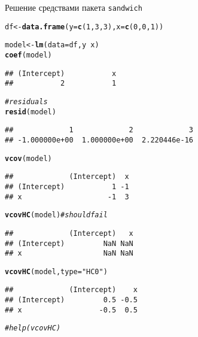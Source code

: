 \documentclass[pdftex,11pt,openany]{book}\usepackage[]{graphicx}\usepackage[]{color}
\makeatletter
\newcommand{\hlnum}[1]{\textcolor[rgb]{0.686,0.059,0.569}{#1}}%
\newcommand{\hlstr}[1]{\textcolor[rgb]{0.192,0.494,0.8}{#1}}%
\newcommand{\hlcom}[1]{\textcolor[rgb]{0.678,0.584,0.686}{\textit{#1}}}%
\newcommand{\hlopt}[1]{\textcolor[rgb]{0,0,0}{#1}}%
\newcommand{\hlstd}[1]{\textcolor[rgb]{0.345,0.345,0.345}{#1}}%
\newcommand{\hlkwb}[1]{\textcolor[rgb]{0.69,0.353,0.396}{#1}}%
\newcommand{\hlkwc}[1]{\textcolor[rgb]{0.333,0.667,0.333}{#1}}%
\newcommand{\hlkwd}[1]{\textcolor[rgb]{0.737,0.353,0.396}{\textbf{#1}}}%
\newenvironment{kframe}{%
 \def\at@end@of@kframe{}%
 \ifinner\ifhmode%
  \def\at@end@of@kframe{\end{minipage}}%
  \begin{minipage}{\columnwidth}%
 \fi\fi%
 \def\FrameCommand##1{\hskip\@totalleftmargin \hskip-\fboxsep
 \colorbox{shadecolor}{##1}\hskip-\fboxsep
     \hskip-\linewidth \hskip-\@totalleftmargin \hskip\columnwidth}%
 \MakeFramed {\advance\hsize-\width
   \@totalleftmargin\z@ \linewidth\hsize
   \@setminipage}}%
 {\par\unskip\endMakeFramed%
 \at@end@of@kframe}
\newenvironment{knitrout}{}{} %
\makeatother
\begin{document}
\begin{solution}
Решение средствами пакета \verb|sandwich|
\begin{knitrout}
\color{fgcolor}\begin{kframe}
\begin{alltt}
\hlstd{df} \hlkwb{<-} \hlkwd{data.frame}\hlstd{(}\hlkwc{y}\hlstd{=}\hlkwd{c}\hlstd{(}\hlnum{1}\hlstd{,}\hlnum{3}\hlstd{,}\hlnum{3}\hlstd{),} \hlkwc{x}\hlstd{=}\hlkwd{c}\hlstd{(}\hlnum{0}\hlstd{,}\hlnum{0}\hlstd{,}\hlnum{1}\hlstd{))}

\hlstd{model} \hlkwb{<-} \hlkwd{lm}\hlstd{(}\hlkwc{data}\hlstd{=df, y}\hlopt{~}\hlstd{x)}
\hlkwd{coef}\hlstd{(model)}
\end{alltt}
\begin{verbatim}
## (Intercept)           x 
##           2           1
\end{verbatim}
\begin{alltt}
\hlcom{# residuals}
\hlkwd{resid}\hlstd{(model)}
\end{alltt}
\begin{verbatim}
##             1             2             3 
## -1.000000e+00  1.000000e+00  2.220446e-16
\end{verbatim}
\begin{alltt}
\hlkwd{vcov}\hlstd{(model)}
\end{alltt}
\begin{verbatim}
##             (Intercept)  x
## (Intercept)           1 -1
## x                    -1  3
\end{verbatim}
\begin{alltt}
\hlkwd{vcovHC}\hlstd{(model)} \hlcom{# should fail}
\end{alltt}
\begin{verbatim}
##             (Intercept)   x
## (Intercept)         NaN NaN
## x                   NaN NaN
\end{verbatim}
\begin{alltt}
\hlkwd{vcovHC}\hlstd{(model,} \hlkwc{type} \hlstd{=}\hlstr{"HC0"} \hlstd{)}
\end{alltt}
\begin{verbatim}
##             (Intercept)    x
## (Intercept)         0.5 -0.5
## x                  -0.5  0.5
\end{verbatim}
\begin{alltt}
\hlcom{# help(vcovHC)}
\end{alltt}
\end{kframe}
\end{knitrout}


\end{solution}
\end{document}
